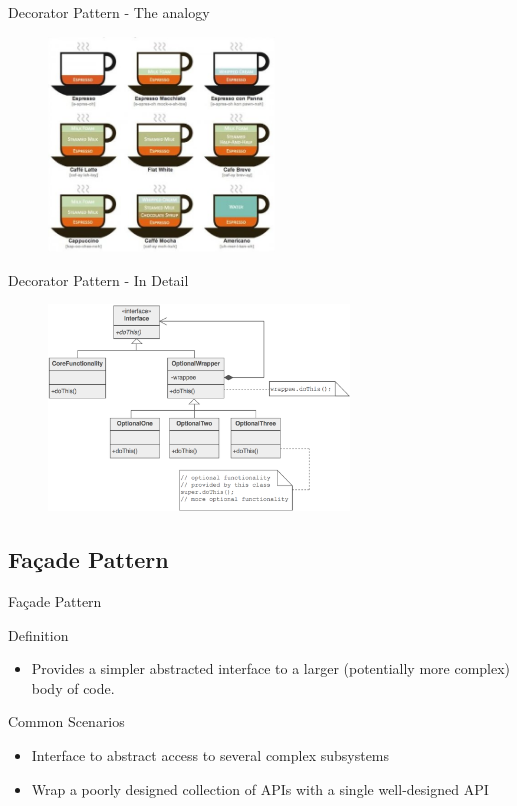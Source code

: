 \documentclass{beamer}
\begin{document}
\begin{frame}{Decorator Pattern - The analogy}
    \begin{figure}[htp]
    \centering
    \includegraphics[width=6cm]{pics/coffee}
    \label{fig:decorator}
    \end{figure}
\end{frame}

\begin{frame}{Decorator Pattern - In Detail}
    \begin{figure}[htp]
    \centering
    \includegraphics[width=8cm]{pics/decorator2}
    \label{fig:decorator2}
    \end{figure}
\end{frame}

\subsection{Fa\c{c}ade Pattern}
\begin{frame}{Fa\c{c}ade Pattern}
  \begin{block}{Definition}
   \begin{itemize}
    \item {Provides a simpler abstracted interface to a larger (potentially more complex) body of code.}
   \end{itemize}
  \end{block}
  \pause
  \begin{block}{Common Scenarios}
   \begin{itemize}
    \item { Interface to abstract access to several complex subsystems }
    \item { Wrap a poorly designed collection of APIs with a single well-designed API }
   \end{itemize}
  \end{block}
\end{frame}
\end{document}
